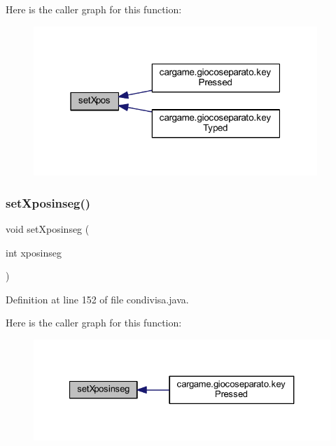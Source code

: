 Here is the caller graph for this function\+:
\nopagebreak
\begin{figure}[H]
\begin{center}
\leavevmode
\includegraphics[width=304pt]{classcargame_1_1condivisa_a7dbd6bcc95ff7838423560d853e1ecec_icgraph}
\end{center}
\end{figure}
\mbox{\label{classcargame_1_1condivisa_a7fc9e9753bb8c6f8023ab94ef56744a6}} 
\subsubsection{\texorpdfstring{set\+Xposinseg()}{setXposinseg()}}
{\footnotesize\ttfamily void set\+Xposinseg (\begin{DoxyParamCaption}\item[{int}]{xposinseg }\end{DoxyParamCaption})}



Definition at line 152 of file condivisa.\+java.

Here is the caller graph for this function\+:
\nopagebreak
\begin{figure}[H]
\begin{center}
\leavevmode
\includegraphics[width=327pt]{classcargame_1_1condivisa_a7fc9e9753bb8c6f8023ab94ef56744a6_icgraph}
\end{center}
\end{figure}
\mbox{\label{classcargame_1_1condivisa_aff8d76fefeea02298942a385888d8161}} 
